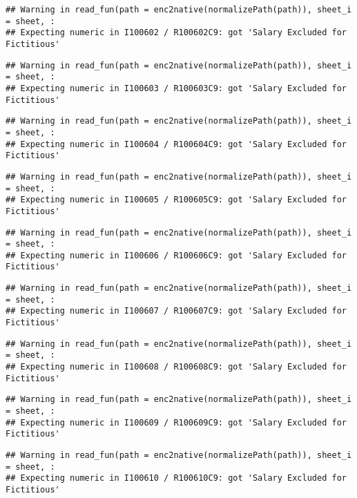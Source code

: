 \documentclass[
]{article}
\begin{document}
\begin{verbatim}
## Warning in read_fun(path = enc2native(normalizePath(path)), sheet_i = sheet, :
## Expecting numeric in I100602 / R100602C9: got 'Salary Excluded for Fictitious'
\end{verbatim}

\begin{verbatim}
## Warning in read_fun(path = enc2native(normalizePath(path)), sheet_i = sheet, :
## Expecting numeric in I100603 / R100603C9: got 'Salary Excluded for Fictitious'
\end{verbatim}

\begin{verbatim}
## Warning in read_fun(path = enc2native(normalizePath(path)), sheet_i = sheet, :
## Expecting numeric in I100604 / R100604C9: got 'Salary Excluded for Fictitious'
\end{verbatim}

\begin{verbatim}
## Warning in read_fun(path = enc2native(normalizePath(path)), sheet_i = sheet, :
## Expecting numeric in I100605 / R100605C9: got 'Salary Excluded for Fictitious'
\end{verbatim}

\begin{verbatim}
## Warning in read_fun(path = enc2native(normalizePath(path)), sheet_i = sheet, :
## Expecting numeric in I100606 / R100606C9: got 'Salary Excluded for Fictitious'
\end{verbatim}

\begin{verbatim}
## Warning in read_fun(path = enc2native(normalizePath(path)), sheet_i = sheet, :
## Expecting numeric in I100607 / R100607C9: got 'Salary Excluded for Fictitious'
\end{verbatim}

\begin{verbatim}
## Warning in read_fun(path = enc2native(normalizePath(path)), sheet_i = sheet, :
## Expecting numeric in I100608 / R100608C9: got 'Salary Excluded for Fictitious'
\end{verbatim}

\begin{verbatim}
## Warning in read_fun(path = enc2native(normalizePath(path)), sheet_i = sheet, :
## Expecting numeric in I100609 / R100609C9: got 'Salary Excluded for Fictitious'
\end{verbatim}

\begin{verbatim}
## Warning in read_fun(path = enc2native(normalizePath(path)), sheet_i = sheet, :
## Expecting numeric in I100610 / R100610C9: got 'Salary Excluded for Fictitious'
\end{verbatim}
\end{document}

